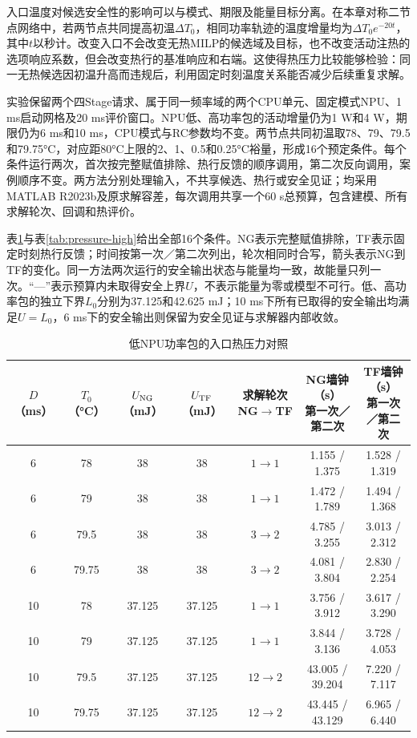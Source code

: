 入口温度对候选安全性的影响可以与模式、期限及能量目标分离。在本章对称二节点网络中，若两节点共同提高初温$\Delta T_0$，相同功率轨迹的温度增量均为$\Delta T_0e^{-20t}$，其中$t$以秒计。改变入口不会改变无热MILP的候选域及目标，也不改变活动注热的选项响应系数，但会改变热行的基准响应和右端。这使得热压力比较能够检验：同一无热候选因初温升高而违规后，利用固定时刻温度关系能否减少后续重复求解。

实验保留两个四Stage请求、属于同一频率域的两个CPU单元、固定模式NPU、1 ms启动网格及20 ms评价窗口。NPU低、高功率包的活动增量仍为1 W和4 W，期限仍为6 ms和10 ms，CPU模式与RC参数均不变。两节点共同初温取78、79、79.5和79.75°C，对应距80°C上限的2、1、0.5和0.25°C裕量，形成16个预定条件。每个条件运行两次，首次按完整赋值排除、热行反馈的顺序调用，第二次反向调用，案例顺序不变。两方法分别处理输入，不共享候选、热行或安全见证；均采用MATLAB R2023b及原求解容差，每次调用共享一个60 s总预算，包含建模、所有求解轮次、回调和热评价。

表\ref{tab:pressure-low}与表\ref{tab:pressure-high}给出全部16个条件。NG表示完整赋值排除，TF表示固定时刻热行反馈；时间按第一次／第二次列出，轮次相同时合写，箭头表示NG到TF的变化。同一方法两次运行的安全输出状态与能量均一致，故能量只列一次。“---”表示预算内未取得安全上界$U$，不表示能量为零或模型不可行。低、高功率包的独立下界$L_0$分别为37.125和42.625 mJ；10 ms下所有已取得的安全输出均满足$U=L_0$，6 ms下的安全输出则保留为安全见证与求解器内部收敛。

\begin{table}[htbp]
\centering\small
\caption{低NPU功率包的入口热压力对照}
\label{tab:pressure-low}
\setlength{\tabcolsep}{3pt}
\begin{tabular}{@{}ccccccc@{}}
\toprule
\shortstack{$D$\\（ms）} & \shortstack{$T_0$\\（°C）} & \shortstack{$U_{\rm NG}$\\（mJ）} & \shortstack{$U_{\rm TF}$\\（mJ）} & \shortstack{求解轮次\\NG$\to$TF} & \shortstack{NG墙钟（s）\\第一次／第二次} & \shortstack{TF墙钟（s）\\第一次／第二次}\\
\midrule
6 & 78 & 38 & 38 & $1\to1$ & 1.155 / 1.375 & 1.528 / 1.319\\
6 & 79 & 38 & 38 & $1\to1$ & 1.472 / 1.789 & 1.494 / 1.368\\
6 & 79.5 & 38 & 38 & $3\to2$ & 4.785 / 3.255 & 3.013 / 2.312\\
6 & 79.75 & 38 & 38 & $3\to2$ & 4.081 / 3.804 & 2.830 / 2.254\\
10 & 78 & 37.125 & 37.125 & $1\to1$ & 3.756 / 3.912 & 3.617 / 3.290\\
10 & 79 & 37.125 & 37.125 & $1\to1$ & 3.844 / 3.136 & 3.728 / 4.053\\
10 & 79.5 & 37.125 & 37.125 & $12\to2$ & 43.005 / 39.204 & 7.220 / 7.117\\
10 & 79.75 & 37.125 & 37.125 & $12\to2$ & 43.445 / 43.129 & 6.965 / 6.440\\
\bottomrule
\end{tabular}
\end{table}

